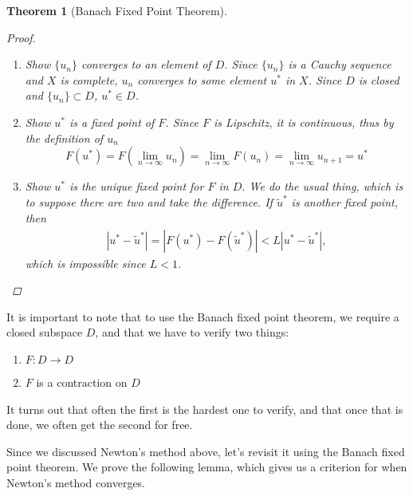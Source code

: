 \documentclass[10pt]{article}         %
\newtheorem{theorem}{Theorem}[section]
\theoremstyle{remark}
\begin{document}
\begin{theorem}[Banach Fixed Point Theorem]
\begin{proof}
\begin{enumerate}
	\item Show $\{ u_n \}$ converges to an element of $D$. Since $\{ u_n \}$ is a Cauchy sequence and $X$ is complete, $u_n$ converges to some element $u^*$ in $X$. Since $D$ is closed and $\{u_n\} \subset D$, $u^* \in D$.
	
	\item Show $u^*$ is a fixed point of $F$. Since $F$ is Lipschitz, it is continuous, thus by the definition of $u_n$
	\[
	F(u^*) = F\left(\lim_{n\rightarrow \infty} u_n\right) = \lim_{n \rightarrow \infty} F(u_n) 
	= \lim_{n \rightarrow \infty} u_{n+1} = u^*
	\]

	\item Show $u^*$ is the unique fixed point for $F$ in $D$. We do the usual thing, which is to suppose there are two and take the difference. If $\tilde{u}^*$ is another fixed point, then
	\begin{align*}
	|u^* - \tilde{u}^*| = |F(u^*) - F(\tilde{u}^*)| < L|u^* - \tilde{u}^*|,
	\end{align*}
	which is impossible since $L < 1$.
\end{enumerate}
\end{proof}
\end{theorem}

It is important to note that to use the Banach fixed point theorem, we require a closed subspace $D$, and that we have to verify two things:
\begin{enumerate}
    \item $F: D \rightarrow D$
    \item $F$ is a contraction on $D$
\end{enumerate}
It turns out that often the first is the hardest one to verify, and that once that is done, we often get the second for free.

Since we discussed Newton's method above, let's revisit it using the Banach fixed point theorem. We prove the following lemma, which gives us a criterion for when Newton's method converges.
\end{document}
